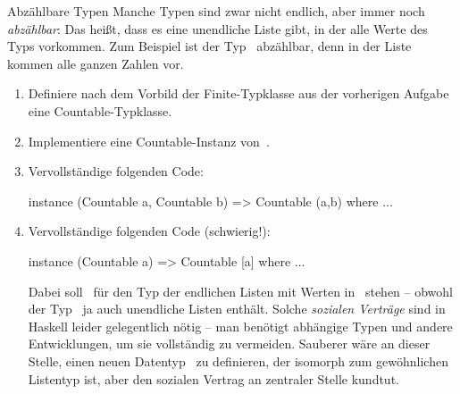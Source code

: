 \documentclass{uebblatt}
\begin{document}
\begin{aufgabe}{Abzählbare Typen}
Manche Typen sind zwar nicht endlich, aber immer noch \emph{abzählbar}: Das
heißt, dass es eine unendliche Liste gibt, in der alle Werte des Typs
vorkommen. Zum Beispiel ist der Typ~ abzählbar, denn in
der Liste~\haskellinline{[0, 1, -1, 2, -2, ...]} kommen alle ganzen Zahlen vor.
\begin{enumerate}
\item Definiere nach dem Vorbild der Finite-Typklasse aus der vorherigen
Aufgabe eine Countable-Typklasse.
\item Implementiere eine Countable-Instanz von~.
\item Vervollständige folgenden Code:
\begin{haskellcode}
instance (Countable a, Countable b) => Countable (a,b) where ...
\end{haskellcode}
\item Vervollständige folgenden Code (schwierig!):
\begin{haskellcode}
instance (Countable a) => Countable [a] where ...
\end{haskellcode}
Dabei soll~\haskellinline{[a]} für den Typ der endlichen Listen mit Werten
in~ stehen -- obwohl der Typ~\haskellinline{[a]} ja auch
unendliche Listen enthält. Solche \emph{sozialen Verträge} sind in Haskell
leider gelegentlich nötig -- man benötigt abhängige Typen und andere
Entwicklungen, um sie vollständig zu vermeiden. Sauberer wäre an dieser Stelle,
einen neuen Datentyp~ zu definieren, der isomorph
zum gewöhnlichen Listentyp ist, aber den sozialen Vertrag an zentraler Stelle
kundtut.
\end{enumerate}
\end{aufgabe}
\end{document}
